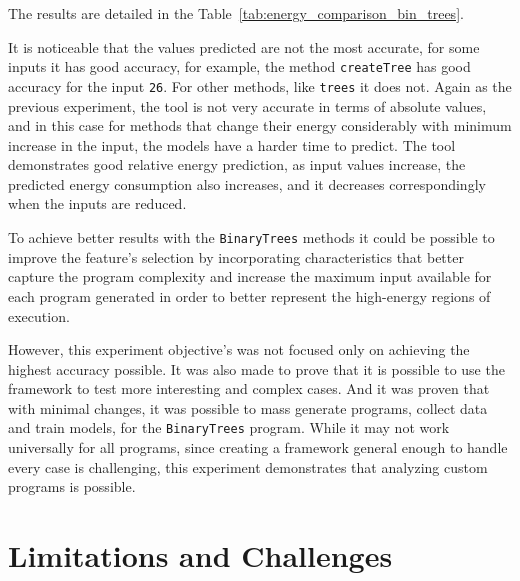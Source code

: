 {\color{blue}
The results are detailed in the Table~\ref{tab:energy_comparison_bin_trees}. 

It is noticeable that the values predicted are not the most accurate, for some inputs it has good accuracy, for example, the method \texttt{createTree} has good accuracy for the input \texttt{26}. For other methods, like \texttt{trees} it does not. Again as the previous experiment, the tool is not very accurate in terms of absolute values, and in this case for methods that change their energy considerably with minimum increase in the input, the models have a harder time to predict. The tool demonstrates good relative energy prediction, as input values increase, the predicted energy consumption also increases, and it decreases correspondingly when the inputs are reduced.

To achieve better results with the \texttt{BinaryTrees} methods it could be possible to improve the feature's selection by incorporating characteristics that better capture the program complexity and increase the maximum input available for each program generated in order to better represent the high-energy regions of execution.

However, this experiment objective's was not focused only on achieving the highest accuracy possible. It was also made to prove that it is possible to use the framework to test more interesting and complex cases. And it was proven that with minimal changes, it was possible to mass generate programs, collect data and train models, for the \texttt{BinaryTrees} program. While it may not work universally for all programs, since creating a framework general enough to handle every case is challenging, this experiment demonstrates that analyzing custom programs is possible.
}





\section{Limitations and Challenges} \label{sec:limitations_and_challenges}

